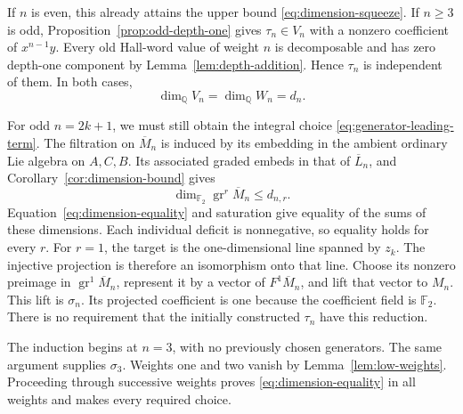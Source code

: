 \documentclass[11pt]{article}
\theoremstyle{definition}
\theoremstyle{remark}
\numberwithin{equation}{section}
\begin{document}
If \(n\) is even, this already attains the upper bound
\eqref{eq:dimension-squeeze}.  If \(n\ge3\) is odd,
Proposition~\ref{prop:odd-depth-one} gives
\(\tau_n\in V_n\) with a nonzero coefficient of \(x^{n-1}y\).
Every old Hall-word value of weight \(n\) is decomposable and
has zero depth-one component by Lemma~\ref{lem:depth-addition}.
Hence \(\tau_n\) is independent of them.  In both cases,
\begin{equation}\label{eq:dimension-equality}
 \dim_\mathbb Q V_n=\dim_\mathbb Q W_n=d_n.
\end{equation}

For odd \(n=2k+1\), we must still obtain the integral choice
\eqref{eq:generator-leading-term}.
The filtration on \(\overline M_n\) is induced by its embedding in
the ambient ordinary Lie algebra on \(A,C,B\).  Its associated
graded embeds in that of \(\overline L_n\), and
Corollary~\ref{cor:dimension-bound} gives
\[
 \dim_{\mathbb F_2}\operatorname{gr}^r\overline M_n\le d_{n,r}.
\]
Equation~\eqref{eq:dimension-equality} and saturation give equality
of the sums of these dimensions.  Each individual deficit is
nonnegative, so equality holds for every \(r\).
For \(r=1\), the target is the one-dimensional line spanned by
\(z_k\).  The injective projection is therefore an isomorphism
onto that line.
Choose its nonzero preimage in \(\operatorname{gr}^1\overline M_n\), represent
it by a vector of \(F^1\overline M_n\), and lift that vector to
\(M_n\).  This lift is \(\sigma_n\).  Its projected coefficient
is one because the coefficient field is \({\mathbb F_2}\).
There is no requirement that the initially constructed
\(\tau_n\) have this reduction.

The induction begins at \(n=3\), with no previously chosen
generators.  The same argument supplies \(\sigma_3\).
Weights one and two vanish by Lemma~\ref{lem:low-weights}.
Proceeding through successive weights proves
\eqref{eq:dimension-equality} in all weights and makes every
required choice.
\end{document}

